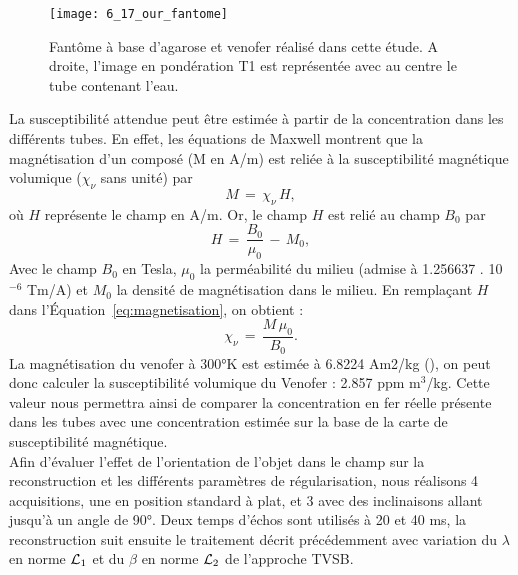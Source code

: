 {%
\begin{figure}[!t]
\centering
\texttt{[image: 6\_17\_our\_fantome]}
\caption{Fantôme à base d'agarose et venofer réalisé dans cette étude. A droite, l'image en pondération
T1 est représentée avec au centre le tube contenant l'eau.}
\label{fig:6_17_our_fantome}	
\end{figure}
La susceptibilité attendue peut être estimée à partir de la concentration dans les différents
tubes. En effet, les équations de Maxwell montrent que la magnétisation d’un composé (M en A/m)
est reliée à la susceptibilité magnétique volumique ($\chi_{\nu}$ sans unité) par
\begin{equation}
\label{eq:magnetisation}
M\,=\,\chi_{\nu}\,H,
\end{equation}
où $H$ représente le champ en A/m. Or, le champ $H$ est relié au champ $B_0$ par
\begin{equation}
H\,=\,\frac{B_0}{\mu_0}\,-\,M_0,
\end{equation}
Avec le champ $B_0$ en Tesla, $\mu_0$ la perméabilité du milieu (admise à 1.256637 . 10$^{-6}$ Tm/A) et $M_0$ la
densité de magnétisation dans le milieu. En remplaçant $H$ dans l’Équation~\ref{eq:magnetisation}, on obtient :
\begin{equation}
\chi_{\nu}\,=\,\frac{M\,\mu_0}{B_0}.
\end{equation}
La magnétisation du venofer à 300°K est estimée à 6.8224 Am2/kg (\cite{Gutierrez2005}), on peut donc calculer la
susceptibilité volumique du Venofer : 2.857 ppm m$^3$/kg. Cette valeur nous permettra ainsi de comparer
la concentration en fer réelle présente dans les tubes avec une concentration estimée sur la base de
la carte de susceptibilité magnétique.\\
Afin d’évaluer l’effet de l’orientation de l’objet dans le champ sur la reconstruction et les
différents paramètres de régularisation, nous réalisons 4 acquisitions, une en position standard à plat,
et 3 avec des inclinaisons allant jusqu’à un angle de 90°. Deux temps d’échos sont utilisés à 20 et 40
ms, la reconstruction suit ensuite le traitement décrit précédemment avec variation du $\lambda$ en norme ${\cal L}_1$
et du $\beta$ en norme ${\cal L}_2$ de l’approche TVSB.\\
}
